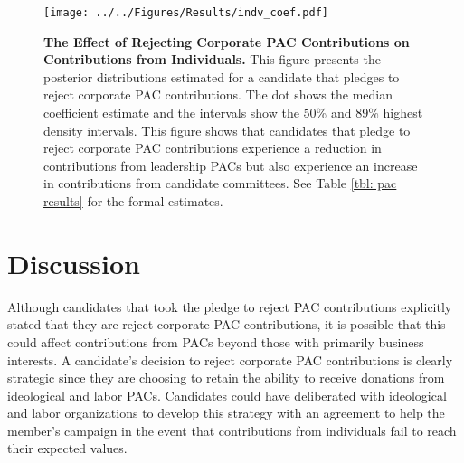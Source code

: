 \documentclass[12pt]{article}
\begin{document}
\begin{figure}[ht]
	\centering
	\texttt{[image: ../../Figures/Results/indv\_coef.pdf]}
	\caption{\textbf{The Effect of Rejecting Corporate PAC Contributions on Contributions from Individuals.} This figure presents the posterior distributions estimated for a candidate that pledges to reject corporate PAC contributions. The dot shows the median coefficient estimate and the intervals show the 50\% and 89\% highest density intervals. This figure shows that candidates that pledge to reject corporate PAC contributions experience a reduction in contributions from leadership PACs but also experience an increase in contributions from candidate committees. See Table \ref{tbl: pac results} for the formal estimates.}
	\label{fig: individual results}
\end{figure}


\section{Discussion}

 Although candidates that took the pledge to reject PAC contributions explicitly stated that they are reject corporate PAC contributions, it is possible that this could affect contributions from PACs beyond those with primarily business interests. A candidate's decision to reject corporate PAC contributions is clearly strategic since they are choosing to retain the ability to receive donations from ideological and labor PACs. Candidates could have deliberated with ideological and labor organizations to develop this strategy with an agreement to help the member's campaign in the event that contributions from individuals fail to reach their expected values. 


\pagebreak
\singlespacing
{}
%
\printbibliography
\pagebreak


\begin{appendices}
\doublespacing
\setcounter{table}{0}
\renewcommand{\thetable}{A\arabic{table}}

\begin{landscape}



\end{landscape}

%

\end{appendices}
\end{document}
